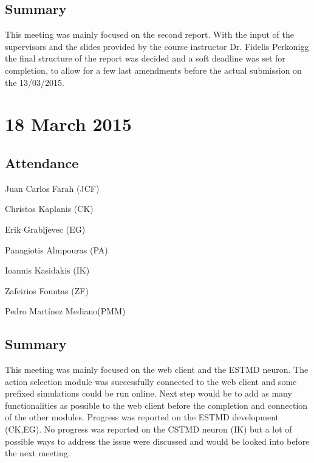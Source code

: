 \documentclass[a4paper,11pt]{article}
\begin{document}
\subsection*{Summary}
This meeting was mainly focused on the second report. With the input of the supervisors and the slides provided by the course instructor Dr. Fidelis Perkonigg the final structure of the report was decided and a soft deadline was set for completion, to allow for a few last amendments before the actual submission on the 13/03/2015.

\maketitle
\section*{18 March 2015}
\subsection*{Attendance}
\begin{compactenum}
\item Juan Carlos Farah (JCF)
\item Christos Kaplanis (CK)
\item Erik Grabljevec (EG)
\item Panagiotis Almpouras (PA)
\item Ioannis Kasidakis (IK)
\item Zafeirios Fountas (ZF)
\item Pedro Martínez Mediano(PMM)
\end{compactenum}

\subsection*{Summary}
This meeting was mainly focused on the web client and the ESTMD neuron. The action selection module was successfully connected to the web client and some prefixed simulations could be run online. Next step would be to add as many functionalities as possible to the web client before the completion and connection of the other modules. Progress was reported on the ESTMD development (CK,EG). No progress was reported on the CSTMD neuron (IK) but a lot of possible ways to address the issue were discussed and would be looked into before the next meeting.

\maketitle
\end{document}
